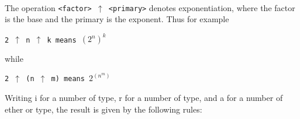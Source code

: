 \documentclass[a4paper,11pt]{article}
\begin{document}
\paragraph{} \label{LblOperatorsAndTypesP3}
The operation \texttt{<factor> $\uparrow$ <primary>} denotes
exponentiation, where the factor is the base and the primary is the
exponent.  Thus for example

\begin{flushleft}
\texttt{2 $\uparrow$ n $\uparrow$ k means $(2^n)^k$}\\
\end{flushleft}

while

\begin{flushleft}
\texttt{2 $\uparrow$ (n $\uparrow$ m)  means  $2^{(n^m)}$}\\
\end{flushleft}


Writing i for a number of  type, r for a number of
 type, and a for a number of ether  or
 type, the result is given by the following rules:
\end{document}
